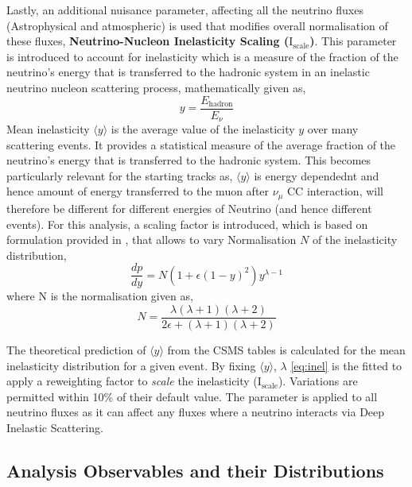 Lastly, an additional nuisance parameter, affecting all the neutrino fluxes (Astrophysical and atmospheric) is used that modifies overall normalisation of these fluxes, \textbf{Neutrino-Nucleon Inelasticity Scaling ($\mathrm{I}_{\mathrm{scale}}$)}. This parameter is introduced to account for  inelasticity which is a measure of the fraction of the neutrino's energy that is transferred to the hadronic system in an inelastic neutrino nucleon scattering process, mathematically given as,
\begin{equation}
     y  = \frac{E_{\text{hadron}}}{E_\nu}
\end{equation}
Mean inelasticity $\langle y \rangle$ is the average value of the inelasticity $y$ over many scattering events. It provides a statistical measure of the average fraction of the neutrino's energy that is transferred to the hadronic system. This becomes particularly relevant for the starting tracks as, $\langle y \rangle$ is energy dependednt and hence amount of energy transferred to the muon after $\nu_{\mu}$ CC interaction, will therefore be different for different energies of Neutrino (and hence different events). For this analysis, a scaling factor is introduced, which is based on formulation provided in , that allows to vary Normalisation $N$ of the inelasticity distribution, 
\begin{equation}
    \frac{dp}{dy} = N \left( 1 + \epsilon (1 - y)^2 \right) y^{\lambda - 1}
\end{equation}
where N is the normalisation given as,
\begin{equation}\label{eq:inel}
    N = \frac{\lambda (\lambda + 1) (\lambda + 2)}{2\epsilon + (\lambda + 1) (\lambda + 2)}
\end{equation}

The theoretical prediction of \(\langle y \rangle\) from the CSMS tables  is calculated for the mean inelasticity distribution for a given event. By fixing \(\langle y \rangle\), $\lambda$ \ref{eq:inel} is the fitted to apply a reweighting factor to \textit{scale} the inelasticity ($\mathrm{I}_{\mathrm{scale}}$). Variations are permitted within 10\% of their default value. The parameter is applied to all neutrino fluxes as it can affect any fluxes where a neutrino interacts via Deep Inelastic Scattering.

\subsection{Analysis Observables and their Distributions}
\label{sec:hists}

